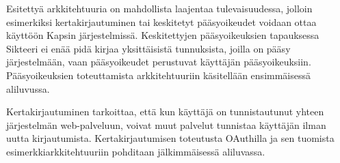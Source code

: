 Esitettyä arkkitehtuuria on mahdollista laajentaa tulevaisuudessa, jolloin esimerkiksi kertakirjautuminen tai keskitetyt pääsyoikeudet voidaan ottaa käyttöön Kapsin järjestelmissä. Keskitettyjen pääsyoikeuksien tapauksessa Sikteeri ei enää pidä kirjaa yksittäisistä tunnuksista, joilla on pääsy järjestelmään, vaan pääsyoikeudet perustuvat käyttäjän pääsyoikeuksiin. Pääsyoikeuksien toteuttamista arkkitehtuuriin käsitellään ensimmäisessä aliluvussa.

Kertakirjautuminen tarkoittaa, että kun käyttäjä on tunnistautunut yhteen järjestelmän web-palveluun, voivat muut palvelut tunnistaa käyttäjän ilman uutta kirjautumista. Kertakirjautumisen toteutusta OAuthilla ja sen tuomista esimerkkiarkkitehtuuriin pohditaan jälkimmäisessä aliluvassa.